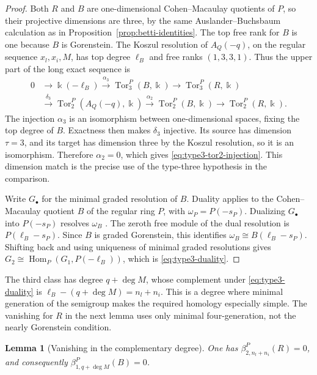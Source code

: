 \documentclass[10pt]{amsart}
\theoremstyle{plain}
\newtheorem{lemma}{Lemma}[section]
\begin{document}
\begin{proof}
Both \(R\) and \(B\) are one-dimensional Cohen--Macaulay quotients of
\(P\), so their projective dimensions are three, by the same
Auslander--Buchsbaum calculation as in
Proposition~\ref{prop:betti-identities}.  The top free rank for \(B\) is
one because \(B\) is Gorenstein.  The Koszul resolution of
\(A_Q(-q)\), on the regular sequence \(x_l,x_i,M\), has top degree
\(\ell_B\) and free ranks \((1,3,3,1)\).  Thus the upper part of the
long exact sequence is
\[
\begin{aligned}
0&\longrightarrow\Bbbk(-\ell_B)
 \xrightarrow{\alpha_3}\operatorname{Tor}_3^P(B,\Bbbk)
 \longrightarrow\operatorname{Tor}_3^P(R,\Bbbk)\\
 &\xrightarrow{\delta_3}\operatorname{Tor}_2^P(A_Q(-q),\Bbbk)
 \xrightarrow{\alpha_2}\operatorname{Tor}_2^P(B,\Bbbk)
 \longrightarrow\operatorname{Tor}_2^P(R,\Bbbk).
\end{aligned}
\]
The injection \(\alpha_3\) is an isomorphism between one-dimensional
spaces, fixing the top degree of \(B\).  Exactness then makes
\(\delta_3\) injective.  Its source has dimension \(\tau=3\), and its
target has dimension three by the Koszul resolution, so it is an
isomorphism.  Therefore \(\alpha_2=0\), which gives
\eqref{eq:type3-tor2-injection}.  This dimension match is the precise
use of the type-three hypothesis in the comparison.

Write \(G_\bullet\) for the minimal graded resolution of \(B\).
Duality applies to the Cohen--Macaulay quotient \(B\) of the regular
ring \(P\), with \(\omega_P=P(-s_P)\).
Dualizing \(G_\bullet\) into \(P(-s_P)\) resolves
\(\omega_B\) \cite[Corollary~21.16 and \S21.11]{Eis95}.
The zeroth free module of the dual resolution is
\(P(\ell_B-s_P)\).  Since \(B\) is graded Gorenstein, this identifies
\(\omega_B\cong B(\ell_B-s_P)\).  Shifting back and using uniqueness
of minimal graded resolutions gives
\(G_2\cong\operatorname{Hom}_P(G_1,P(-\ell_B))\), which is
\eqref{eq:type3-duality}.
\end{proof}

The third class has degree \(q+\deg M\), whose complement under
\eqref{eq:type3-duality} is
\(\ell_B-(q+\deg M)=n_l+n_i\).  This is a degree where minimal
generation of the semigroup makes the required homology especially
simple.  The vanishing for \(R\) in the next lemma uses only minimal
four-generation, not the nearly Gorenstein condition.

\begin{lemma}[Vanishing in the complementary degree]
\label{lem:type3-complementary-vanishing}
One has \(\beta_{2,n_l+n_i}^P(R)=0\), and consequently
\(\beta_{1,q+\deg M}^P(B)=0\).
\end{lemma}
\end{document}
